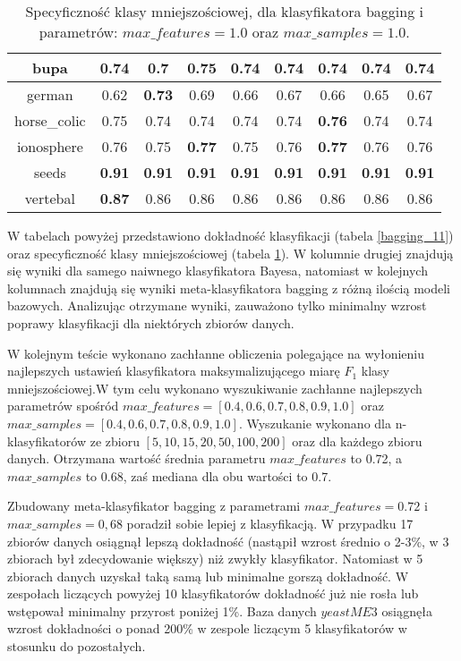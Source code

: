 \begin{table}[H]
\begin{center}
{\begin{tabular}{c|cccccccc}
			\hline%
			bupa&0.74&0.7&\textbf{0.75}&0.74&0.74&0.74&0.74&0.74\\%
			\hline%
			german&0.62&\textbf{0.73}&0.69&0.66&0.67&0.66&0.65&0.67\\%
			\hline%
			horse\_colic&0.75&0.74&0.74&0.74&0.74&\textbf{0.76}&0.74&0.74\\%
			\hline%
			ionosphere&0.76&0.75&\textbf{0.77}&0.75&0.76&\textbf{0.77}&0.76&0.76\\%
			\hline%
			seeds&\textbf{0.91}&\textbf{0.91}&\textbf{0.91}&\textbf{0.91}&\textbf{0.91}&\textbf{0.91}&\textbf{0.91}&\textbf{0.91}\\%
			\hline%
			vertebal&\textbf{0.87}&0.86&0.86&0.86&0.86&0.86&0.86&0.86\\%
			\hline%
		\end{tabular}}
		\caption{Specyficzność klasy mniejszościowej, dla klasyfikatora bagging i parametrów: $max\_features = 1.0$ oraz $max\_samples = 1.0$.}
		\label{bagging-specyficznosc11}
	\end{center}
\end{table}
W tabelach powyżej przedstawiono dokładność klasyfikacji (tabela \ref{bagging_11}) oraz specyficzność klasy mniejszościowej (tabela \ref{bagging-specyficznosc11}). W kolumnie drugiej znajdują się wyniki dla samego naiwnego klasyfikatora Bayesa, natomiast w kolejnych kolumnach znajdują się wyniki meta-klasyfikatora bagging z różną ilością modeli bazowych. Analizując otrzymane wyniki, zauważono tylko minimalny wzrost poprawy klasyfikacji dla niektórych zbiorów danych.\par
W kolejnym teście wykonano zachłanne obliczenia polegające na wyłonieniu najlepszych ustawień klasyfikatora maksymalizującego miarę $F_1$ klasy mniejszościowej.W tym celu wykonano wyszukiwanie zachłanne najlepszych parametrów spośród $max\_features=[0.4, 0.6, 0.7, 0.8, 0.9, 1.0]$ oraz $max\_samples=[0.4, 0.6, 0.7, 0.8, 0.9, 1.0]$. Wyszukanie wykonano dla n-klasyfikatorów ze zbioru $[5, 10, 15, 20, 50, 100, 200]$ oraz dla każdego zbioru danych. Otrzymana wartość średnia parametru $max\_features$ to 0.72, a $max\_samples$ to 0.68, zaś mediana dla obu wartości to 0.7. \par
Zbudowany meta-klasyfikator bagging z parametrami $max\_features=0.72$ i $max\_samples=0,68$ poradził sobie lepiej z klasyfikacją. W przypadku 17 zbiorów danych osiągnął lepszą dokładność (nastąpił wzrost średnio o 2-3\%, w 3 zbiorach był zdecydowanie większy) niż zwykły klasyfikator. Natomiast w 5 zbiorach danych uzyskał taką samą lub minimalne gorszą dokładność. W zespołach liczących powyżej 10 klasyfikatorów dokładność już nie rosła lub wstępował minimalny przyrost poniżej 1\%. Baza danych $yeastME3$ osiągnęła wzrost dokładności o ponad 200\% w zespole liczącym 5 klasyfikatorów w stosunku do pozostałych.
